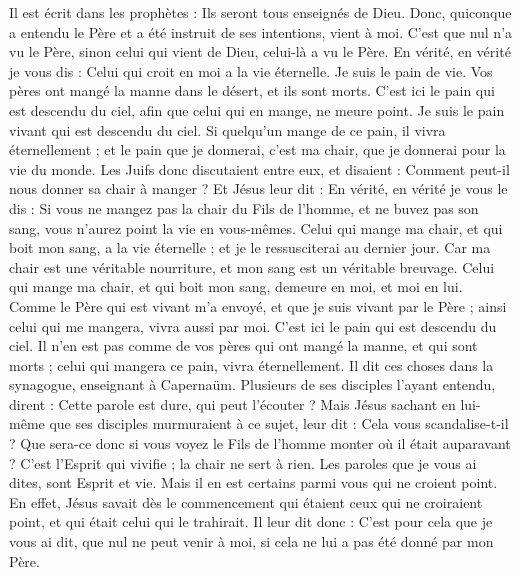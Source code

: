 \begin{multicols}{2}
Il est écrit dans les prophètes : Ils seront tous enseignés de Dieu. Donc, quiconque a entendu le Père et a été instruit de ses intentions, vient à moi.
C'est que nul n'a vu le Père, sinon celui qui vient de Dieu, celui-là a vu le Père.
En vérité, en vérité je vous dis : Celui qui croit en moi a la vie éternelle.
Je suis le pain de vie.
Vos pères ont mangé la manne dans le désert, et ils sont morts.
C'est ici le pain qui est descendu du ciel, afin que celui qui en mange, ne meure point.
Je suis le pain vivant qui est descendu du ciel. Si quelqu'un mange de ce pain, il vivra éternellement ; et le pain que je donnerai, c'est ma chair, que je donnerai pour la vie du monde.
Les Juifs donc discutaient entre eux, et disaient : Comment peut-il nous donner sa chair à manger ?
Et Jésus leur dit : En vérité, en vérité je vous le dis : Si vous ne mangez pas la chair du Fils de l'homme, et ne buvez pas son sang, vous n'aurez point la vie en vous-mêmes.
Celui qui mange ma chair, et qui boit mon sang, a la vie éternelle ; et je le ressusciterai au dernier jour.
Car ma chair est une véritable nourriture, et mon sang est un véritable breuvage.
Celui qui mange ma chair, et qui boit mon sang, demeure en moi, et moi en lui.
Comme le Père qui est vivant m'a envoyé, et que je suis vivant par le Père ; ainsi celui qui me mangera, vivra aussi par moi.
C'est ici le pain qui est descendu du ciel. Il n'en est pas comme de vos pères qui ont mangé la manne, et qui sont morts ; celui qui mangera ce pain, vivra éternellement.
Il dit ces choses dans la synagogue, enseignant à Capernaüm.
Plusieurs de ses disciples l'ayant entendu, dirent : Cette parole est dure, qui peut l'écouter ?
Mais Jésus sachant en lui-même que ses disciples murmuraient à ce sujet, leur dit : Cela vous scandalise-t-il ?
Que sera-ce donc si vous voyez le Fils de l'homme monter où il était auparavant ?
C'est l'Esprit qui vivifie ; la chair ne sert à rien. Les paroles que je vous ai dites, sont Esprit et vie.
Mais il en est certains parmi vous qui ne croient point. En effet, Jésus savait dès le commencement qui étaient ceux qui ne croiraient point, et qui était celui qui le trahirait.
Il leur dit donc : C'est pour cela que je vous ai dit, que nul ne peut venir à moi, si cela ne lui a pas été donné par mon Père.

\end{multicols}
